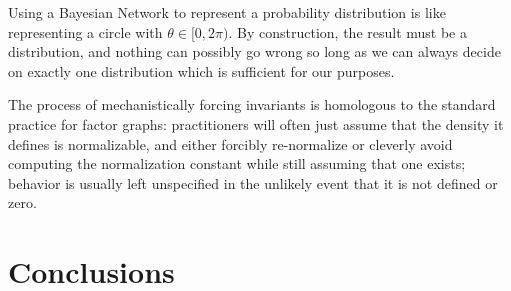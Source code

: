 \documentclass{article}
\begin{document}
\begin{vfull}
		Using a Bayesian Network to represent a probability distribution is like representing a circle with $\theta \in [0, 2\pi)$.
		By construction, the result must be a distribution, and nothing can possibly go wrong so long as we can always decide on exactly one distribution which is sufficient for our purposes.
		
		
		The process of mechanistically forcing invariants is homologous to the standard practice for factor graphs: practitioners will often just assume that the density it defines is normalizable, and either forcibly re-normalize or cleverly avoid computing the normalization constant while still assuming that one exists; behavior is usually left unspecified in the unlikely event that it is not defined or zero.
	\end{vfull}
	
	\section{Conclusions}
\end{document}
